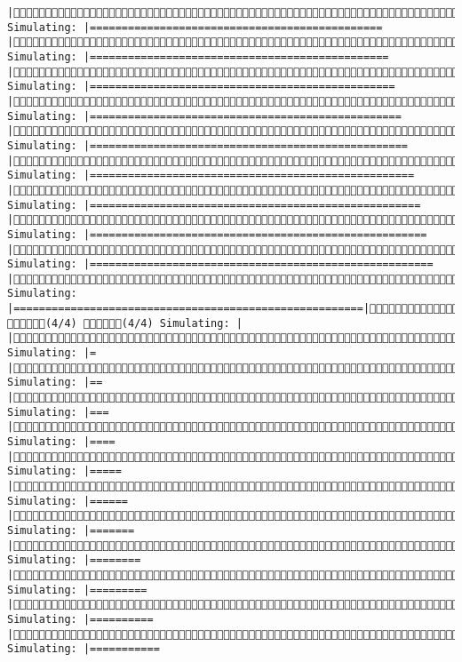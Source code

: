 \documentclass[]{article}
\begin{document}
\begin{verbatim}
|(3/4) Simulating: |==============================================         |(3/4) Simulating: |===============================================        |(3/4) Simulating: |================================================       |(3/4) Simulating: |=================================================      |(3/4) Simulating: |==================================================     |(3/4) Simulating: |===================================================    |(3/4) Simulating: |====================================================   |(3/4) Simulating: |=====================================================  |(3/4) Simulating: |====================================================== |(3/4) Simulating: |=======================================================|(3/4) (4/4) (4/4) Simulating: |                                                       |(4/4) Simulating: |=                                                      |(4/4) Simulating: |==                                                     |(4/4) Simulating: |===                                                    |(4/4) Simulating: |====                                                   |(4/4) Simulating: |=====                                                  |(4/4) Simulating: |======                                                 |(4/4) Simulating: |=======                                                |(4/4) Simulating: |========                                               |(4/4) Simulating: |=========                                              |(4/4) Simulating: |==========                                             |(4/4) Simulating: |===========                                       
\end{verbatim}
\end{document}

